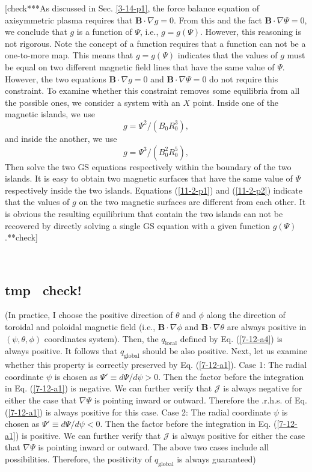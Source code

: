 \documentclass{article}
\newcommand{\tmop}[1]{\ensuremath{\operatorname{#1}}}
\begin{document}
[check***As discussed in Sec. \ref{3-14-p1}, the force balance equation of
axisymmetric plasma requires that $\mathbf{B} \cdot \nabla g = 0$. From this
and the fact $\mathbf{B} \cdot \nabla \Psi = 0$, we conclude that $g$ is a
function of $\Psi$, i.e., $g = g (\Psi)$. However, this reasoning is not
rigorous. Note the concept of a function requires that a function can not be a
one-to-more map. This means that $g = g (\Psi)$ indicates that the values of
$g$ must be equal on two different magnetic field lines that have the same
value of $\Psi$. However, the two equations $\mathbf{B} \cdot \nabla g = 0$
and $\mathbf{B} \cdot \nabla \Psi = 0$ do not require this constraint. To
examine whether this constraint removes some equilibria from all the possible
ones, we consider a system with an $X$ point. Inside one of the magnetic
islands, we use
\begin{equation}
  \label{11-2-p1} g = \Psi^2 / (B_0 R_0^3),
\end{equation}
and inside the another, we use
\begin{equation}
  \label{11-2-p2} g = \Psi^3 / (B_0^2 R_0^5),
\end{equation}
Then solve the two GS equations respectively within the boundary of the two
islands. It is easy to obtain two magnetic surfaces that have the same value
of $\Psi$ respectively inside the two islands. Equations (\ref{11-2-p1}) and
(\ref{11-2-p2}) indicate that the values of $g$ on the two magnetic surfaces
are different from each other. It is obvious the resulting equilibrium that
contain the two islands can not be recovered by directly solving a single GS
equation with a given function $g (\Psi)$.**check]

\

\subsection{tmp \ check!}

(In practice, I choose the positive direction of $\theta$ and $\phi$ along the
direction of toroidal and poloidal magnetic field (i.e., $\mathbf{B} \cdot
\nabla \phi$ and $\mathbf{B} \cdot \nabla \theta$ are always positive in
$(\psi, \theta, \phi)$ coordinates system). Then, the $q_{\tmop{local}}$
defined by Eq. (\ref{7-12-a4}) is always positive. It follows that
$q_{\tmop{global}}$ should be also positive. Next, let us examine whether this
property is correctly preserved by Eq. (\ref{7-12-a1}). Case 1: The radial
coordinate $\psi$ is chosen as $\Psi' \equiv d \Psi / d \psi > 0$. Then the
factor before the integration in Eq. (\ref{7-12-a1}) is negative. We can
further verify that $\mathcal{J}$ is always negative for either the case that
$\nabla \Psi$ is pointing inward or outward. Therefore the .r.h.s. of Eq.
(\ref{7-12-a1}) is always positive for this case. Case 2: The radial
coordinate $\psi$ is chosen as $\Psi' \equiv d \Psi / d \psi < 0$. Then the
factor before the integration in Eq. (\ref{7-12-a1}) is positive. We can
further verify that $\mathcal{J}$ is always positive for either the case that
$\nabla \Psi$ is pointing inward or outward. The above two cases include all
possibilities. Therefore, the positivity of $q_{\tmop{global}}$ is always
guaranteed)
\end{document}
